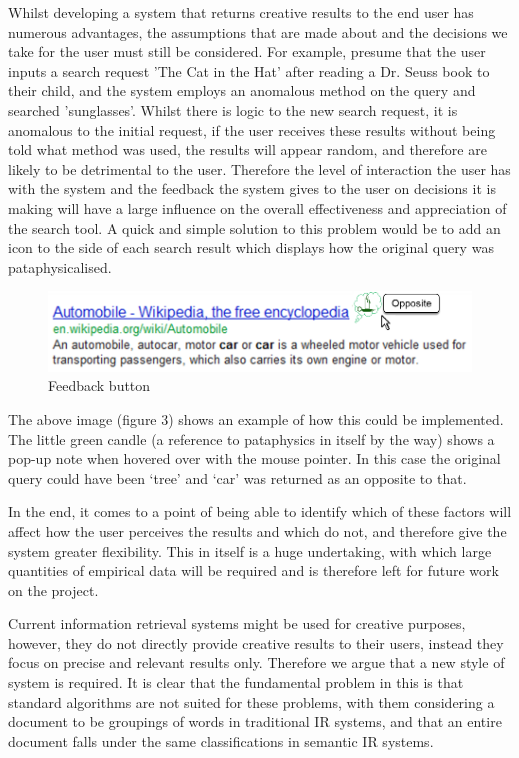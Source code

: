 Whilst developing a system that returns creative results to the end user has numerous advantages, the assumptions that are made about and the decisions we take for the user must still be considered. For example, presume that the user inputs a search request 'The Cat in the Hat' after reading a Dr. Seuss book to their child, and the system employs an anomalous method on the query and searched 'sunglasses'. Whilst there is logic to the new search request, it is anomalous to the initial request, if the user receives these results without being told what method was used, the results will appear random, and therefore are likely to be detrimental to the user. Therefore the level of interaction the user has with the system and the feedback the system gives to the user on decisions it is making will have a large influence on the overall effectiveness and appreciation of the search tool. A quick and simple solution to this problem would be to add an icon to the side of each search result which displays how the original query was pataphysicalised.

\begin{figure}[htb] %
  \centering
  \includegraphics[width=\linewidth]{images/resultexample}
\caption[Feedback button]{Feedback button}
\label{fig:feedback}
\end{figure}

The above image (figure 3) shows an example of how this could be implemented. The little green candle (a reference to pataphysics in itself by the way) shows a pop-up note when hovered over with the mouse pointer. In this case the original query could have been ‘tree’ and ‘car’ was returned as an opposite to that.

In the end, it comes to a point of being able to identify which of these factors will affect how the user perceives the results and which do not, and therefore give the system greater flexibility. This in itself is a huge undertaking, with which large quantities of empirical data will be required and is therefore left for future work on the project.

Current information retrieval systems might be used for creative purposes, however, they do not directly provide creative results to their users, instead they focus on precise and relevant results only. Therefore we argue that a new style of system is required. It is clear that the fundamental problem in this is that standard algorithms are not suited for these problems, with them considering a document to be groupings of words in traditional IR systems, and that an entire document falls under the same classifications in semantic IR systems.

